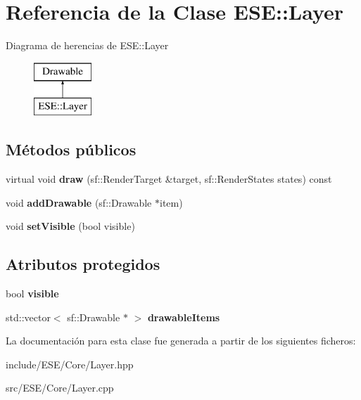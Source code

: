 \hypertarget{class_e_s_e_1_1_layer}{\section{Referencia de la Clase E\-S\-E\-:\-:Layer}
\label{class_e_s_e_1_1_layer}
}
Diagrama de herencias de E\-S\-E\-:\-:Layer\begin{figure}[H]
\begin{center}
\leavevmode
\includegraphics[height=2.000000cm]{class_e_s_e_1_1_layer}
\end{center}
\end{figure}
\subsection*{Métodos públicos}
\begin{DoxyCompactItemize}
\item 
\hypertarget{class_e_s_e_1_1_layer_a29459f6e01ded4118f92d69b8d4e18b8}{virtual void {\bfseries draw} (sf\-::\-Render\-Target \&target, sf\-::\-Render\-States states) const }\label{class_e_s_e_1_1_layer_a29459f6e01ded4118f92d69b8d4e18b8}

\item 
\hypertarget{class_e_s_e_1_1_layer_a46f97adf22072271198b24002bcab4f6}{void {\bfseries add\-Drawable} (sf\-::\-Drawable $\ast$item)}\label{class_e_s_e_1_1_layer_a46f97adf22072271198b24002bcab4f6}

\item 
\hypertarget{class_e_s_e_1_1_layer_a0fbd403cb05959adb7d9d2e84d37ec52}{void {\bfseries set\-Visible} (bool visible)}\label{class_e_s_e_1_1_layer_a0fbd403cb05959adb7d9d2e84d37ec52}

\end{DoxyCompactItemize}
\subsection*{Atributos protegidos}
\begin{DoxyCompactItemize}
\item 
\hypertarget{class_e_s_e_1_1_layer_aa1a201122fc3764662cc990b948c8093}{bool {\bfseries visible}}\label{class_e_s_e_1_1_layer_aa1a201122fc3764662cc990b948c8093}

\item 
\hypertarget{class_e_s_e_1_1_layer_a354d1f6a45375d8fce644f6c218a6127}{std\-::vector$<$ sf\-::\-Drawable $\ast$ $>$ {\bfseries drawable\-Items}}\label{class_e_s_e_1_1_layer_a354d1f6a45375d8fce644f6c218a6127}

\end{DoxyCompactItemize}


La documentación para esta clase fue generada a partir de los siguientes ficheros\-:\begin{DoxyCompactItemize}
\item 
include/\-E\-S\-E/\-Core/Layer.\-hpp\item 
src/\-E\-S\-E/\-Core/Layer.\-cpp\end{DoxyCompactItemize}
